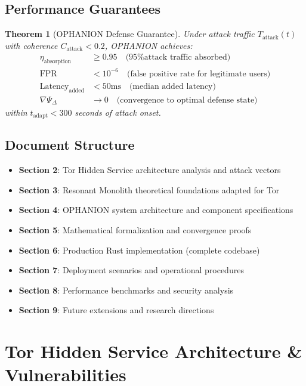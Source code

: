 \documentclass[11pt,a4paper]{article}
\newtheorem{theorem}{Theorem}[section]
\begin{document}
\subsection{Performance Guarantees}

\begin{theorem}[OPHANION Defense Guarantee]
Under attack traffic $T_{\text{attack}}(t)$ with coherence $C_{\text{attack}} < 0.2$, OPHANION achieves:
\begin{align}
\eta_{\text{absorption}} &\geq 0.95 \quad \text{(95\% attack traffic absorbed)} \\
\text{FPR} &< 10^{-6} \quad \text{(false positive rate for legitimate users)} \\
\text{Latency}_{\text{added}} &< 50\text{ms} \quad \text{(median added latency)} \\
\nabla\Psi_\Delta &\to 0 \quad \text{(convergence to optimal defense state)}
\end{align}
within $t_{\text{adapt}} < 300$ seconds of attack onset.
\end{theorem}

\subsection{Document Structure}

\begin{itemize}
\item \textbf{Section 2}: Tor Hidden Service architecture analysis and attack vectors
\item \textbf{Section 3}: Resonant Monolith theoretical foundations adapted for Tor
\item \textbf{Section 4}: OPHANION system architecture and component specifications
\item \textbf{Section 5}: Mathematical formalization and convergence proofs
\item \textbf{Section 6}: Production Rust implementation (complete codebase)
\item \textbf{Section 7}: Deployment scenarios and operational procedures
\item \textbf{Section 8}: Performance benchmarks and security analysis
\item \textbf{Section 9}: Future extensions and research directions
\end{itemize}

\newpage
\section{Tor Hidden Service Architecture \& Vulnerabilities}
\end{document}
